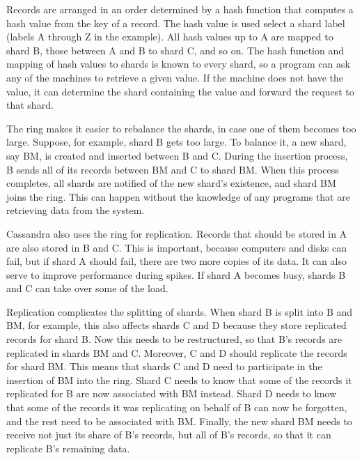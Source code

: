 Records are arranged in an order determined by a hash function
that computes a hash value from the key of a record.
The hash value is used select a shard label (labels A through Z in the example).
All hash values up to A are mapped to shard B,
those between A and B to shard C, and so on.
The hash function and mapping of hash values to shards is known to every shard,
so a program can ask any of the machines to retrieve a given value.
If the machine does not have the value,
it can determine the shard containing the value
and forward the request to that shard.

The ring makes it easier to rebalance the shards,
in case one of them becomes too large.
Suppose, for example, shard B gets too large.
To balance it, a new shard, say BM, is created and inserted between B and C.
During the insertion process, B sends all of its records between BM and C to shard BM.
When this process completes, all shards are notified of the new
shard's existence, and shard BM joins the ring.
This can happen without the knowledge of any programs
that are retrieving data from the system.

Cassandra also uses the ring for replication.
Records that should be stored in A
are also stored in B and C.
This is important, because computers and disks can fail,
but if shard A should fail, there are two more copies of its data.
It can also serve to improve performance during spikes.
If shard A becomes busy, shards B and C can take over some of the load.

Replication complicates the splitting of shards.
When shard B is split into B and BM, for example, this also affects shards C and D
because they store replicated records for shard B.
Now this needs to be restructured, so that B's records are replicated in shards BM and C.
Moreover, C and D should replicate the records for shard BM.
This means that shards C and D need
to participate in the insertion of BM into the ring.
Shard C needs to know that some of the records
it replicated for B are now associated with BM instead.
Shard D needs to know that some of the records it was replicating
on behalf of B can now be forgotten, and the rest need to be associated with BM.
Finally, the new shard BM needs to receive not just its share
of B's records, but all of B's records, so that it can replicate B's remaining data.

